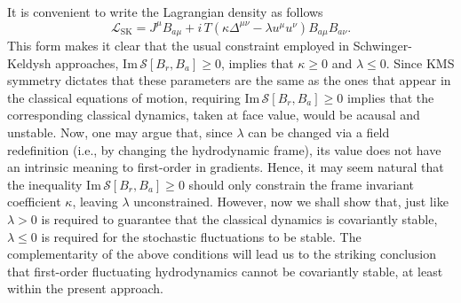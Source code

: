 \documentclass[aps,prd,nofootinbib,amsmath,amssymb,showpacs,longbibliography,singlecolumn,superscriptaddress,notitlepage]{revtex4-1}
\theoremstyle{plain}
\theoremstyle{definition}
\begin{document}
It is convenient to write the Lagrangian density as follows 
\begin{equation} \label{U1_action_JB}
    \mathcal{L}_{\mathrm{SK}} = J^{\mu} B_{a\mu} + i\, T \left(  \kappa \Delta^{\mu\nu} - \lambda u^{\mu} u^{\nu} \right) B_{a\mu} B_{a\nu}.
\end{equation}
This form makes it clear that the usual constraint employed in Schwinger-Keldysh approaches, $\mathrm{Im} \,\mathcal{S}[B_r,B_a]\geq 0$, implies that $\kappa \geq 0$ and $\lambda \leq 0$. Since KMS symmetry dictates that these parameters are the same as the ones that appear in the classical equations of motion, requiring $\mathrm{Im} \,\mathcal{S}[B_r,B_a]\geq 0$ implies that the corresponding classical dynamics, taken at face value, would be acausal and unstable.  
Now, one may argue that, since $\lambda$ can be changed via a field redefinition (i.e., by changing the hydrodynamic frame), its value does not have an intrinsic meaning to first-order in gradients. Hence, it may seem natural that the inequality $\mathrm{Im} \,\mathcal{S}[B_r,B_a]\geq 0$ should only  constrain the frame invariant coefficient $\kappa$, leaving $\lambda$ unconstrained. However, now we shall show that, just like $\lambda > 0$ is required to guarantee that the classical dynamics is covariantly stable,  $\lambda \leq 0$ is required for the stochastic fluctuations to be stable. The complementarity of the above conditions will lead us to the striking conclusion that first-order fluctuating hydrodynamics cannot be covariantly stable, at least within the present approach. 
\end{document}
